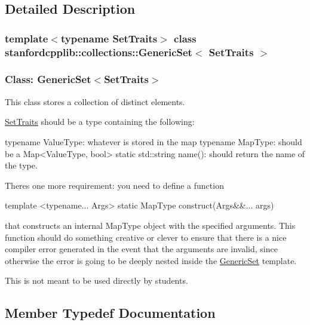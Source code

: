 \subsection{Detailed Description}
\subsubsection*{template$<$typename Set\+Traits$>$\newline
class stanfordcpplib\+::collections\+::\+Generic\+Set$<$ Set\+Traits $>$}

\subsubsection*{Class\+: Generic\+Set$<$\+Set\+Traits$>$ }

This class stores a collection of distinct elements. 

\mbox{\hyperlink{structstanfordcpplib_1_1collections_1_1SetTraits}{Set\+Traits}} should be a type containing the following\+: \begin{DoxyVerb}typename ValueType:          whatever is stored in the map
typename MapType:            should be a Map<ValueType, bool>
static std::string name():   should return the name of the type.
\end{DoxyVerb}


There\textquotesingle{}s one more requirement\+: you need to define a function \begin{DoxyVerb}template <typename... Args>
   static MapType construct(Args&&... args)
\end{DoxyVerb}


that constructs an internal Map\+Type object with the specified arguments. This function should do something creative or clever to ensure that there is a nice compiler error generated in the event that the arguments are invalid, since otherwise the error is going to be deeply nested inside the \mbox{\hyperlink{classstanfordcpplib_1_1collections_1_1GenericSet}{Generic\+Set}} template.

This is not meant to be used directly by students. 

\subsection{Member Typedef Documentation}
\mbox{\label{classstanfordcpplib_1_1collections_1_1GenericSet_a49eb513fe04e245250a4aebfb1ac768a}} 
